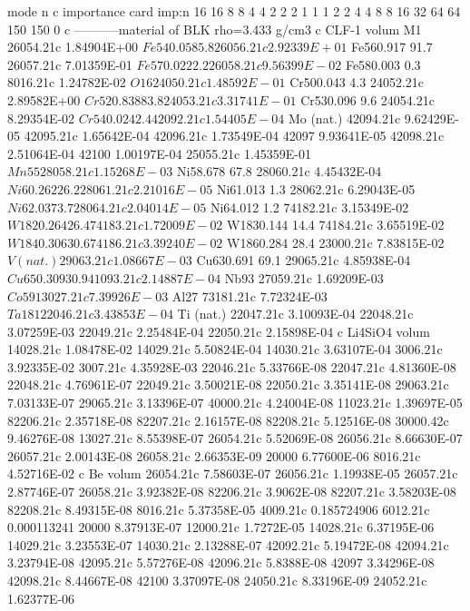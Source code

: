 \begin{python}
mode n
c importance card
imp:n 16 16 8 8 4 4 2 2 2 1 1 1 2 2 4 4 8 8 16 32 64 64 150 150 0
c -----------material of BLK   rho=3.433 g/cm3
c CLF-1 volum%
M1 26054.21c 1.84904E+00  $  Fe540.058   5.8%
26056.21c 2.92339E+01  $  Fe560.917  91.7%
26057.21c 7.01359E-01  $  Fe570.022   2.2%
26058.21c 9.56399E-02  $  Fe580.003   0.3%
8016.21c  1.24782E-02  $  O16
24050.21c 1.48592E-01  $  Cr500.043   4.3%
24052.21c 2.89582E+00  $  Cr520.838  83.8%
24053.21c 3.31741E-01  $  Cr530.096   9.6%
24054.21c 8.29354E-02  $  Cr540.024   2.4%
42092.21c 1.54405E-04  $  Mo         (nat.)
42094.21c 9.62429E-05
42095.21c 1.65642E-04
42096.21c 1.73549E-04
42097 9.93641E-05
42098.21c 2.51064E-04
42100 1.00197E-04
25055.21c 1.45359E-01  $  Mn55
28058.21c 1.15268E-03  $  Ni58.678   67.8%
28060.21c 4.45432E-04  $  Ni60.262   26.2%
28061.21c 2.21016E-05  $  Ni61.013    1.3%
28062.21c 6.29043E-05  $  Ni62.037    3.7%
28064.21c 2.04014E-05  $  Ni64.012    1.2%
74182.21c 3.15349E-02  $  W1820.264  26.4%
74183.21c 1.72009E-02  $  W1830.144  14.4%
74184.21c 3.65519E-02  $  W1840.306  30.6%
74186.21c 3.39240E-02  $  W1860.284  28.4%
23000.21c 7.83815E-02  $  V         (nat.)
29063.21c 1.08667E-03  $  Cu630.691  69.1%
29065.21c 4.85938E-04  $  Cu650.309  30.9%
41093.21c 2.14887E-04  $  Nb93
27059.21c 1.69209E-03  $  Co59
13027.21c 7.39926E-03  $  Al27
73181.21c 7.72324E-03  $  Ta181
22046.21c 3.43853E-04  $  Ti         (nat.)
22047.21c 3.10093E-04
22048.21c 3.07259E-03
22049.21c 2.25484E-04
22050.21c 2.15898E-04
c Li4SiO4 volum%
14028.21c 1.08478E-02
14029.21c 5.50824E-04
14030.21c 3.63107E-04
3006.21c 3.92335E-02
3007.21c 4.35928E-03
22046.21c 5.33766E-08
22047.21c 4.81360E-08
22048.21c 4.76961E-07
22049.21c 3.50021E-08
22050.21c 3.35141E-08
29063.21c 7.03133E-07
29065.21c 3.13396E-07
40000.21c 4.24004E-08
11023.21c 1.39697E-05
82206.21c 2.35718E-08
82207.21c 2.16157E-08
82208.21c 5.12516E-08
30000.42c 9.46276E-08
13027.21c 8.55398E-07
26054.21c 5.52069E-08
26056.21c 8.66630E-07
26057.21c 2.00143E-08
26058.21c 2.66353E-09
20000 6.77600E-06
8016.21c 4.52716E-02
c Be volum%
26054.21c 7.58603E-07
26056.21c 1.19938E-05
26057.21c 2.87746E-07
26058.21c 3.92382E-08
82206.21c 3.9062E-08 
82207.21c 3.58203E-08
82208.21c 8.49315E-08
8016.21c 5.37358E-05
4009.21c 0.185724906
6012.21c 0.000113241
20000 8.37913E-07
12000.21c 1.7272E-05 
14028.21c 6.37195E-06
14029.21c 3.23553E-07
14030.21c 2.13288E-07
42092.21c 5.19472E-08
42094.21c 3.23794E-08
42095.21c 5.57276E-08
42096.21c 5.8388E-08 
42097 3.34296E-08
42098.21c 8.44667E-08
42100 3.37097E-08
24050.21c 8.33196E-09
24052.21c 1.62377E-06

\end{python}
